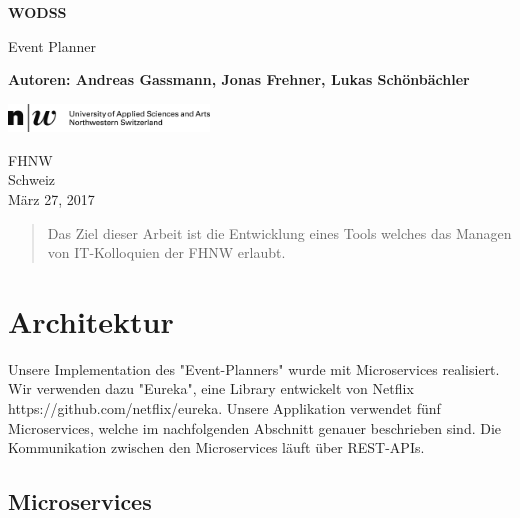 \documentclass[11pt]{article} %
\begin{document}
\begin{titlepage}
    \begin{center}
        \vspace*{1cm}
        
        \Huge
        \textbf{WODSS}
        
        \vspace{0.5cm}
        \LARGE
        Event Planner
      
        \vspace{1.5cm}
        
        \textbf{Autoren: Andreas Gassmann, Jonas Frehner, Lukas Schönbächler}\\

		\vspace{1.5cm}        
                
        \vfill
        
       
        \vspace{0.8cm}
        
        \includegraphics[width=0.4\textwidth]{title/fhnw}
        
        \Large
        FHNW\\
        Schweiz\\
        März 27, 2017
        
    \end{center}
\end{titlepage}

\begin{abstract}
Das Ziel dieser Arbeit ist die Entwicklung eines Tools welches das Managen von IT-Kolloquien der FHNW erlaubt.
\end{abstract}

\newpage
\tableofcontents
\newpage

\section{Architektur}
Unsere Implementation des "Event-Planners" wurde mit Microservices realisiert. Wir verwenden dazu "Eureka", eine Library entwickelt von Netflix https://github.com/netflix/eureka.  Unsere Applikation verwendet fünf Microservices, welche im nachfolgenden Abschnitt genauer beschrieben sind. Die Kommunikation zwischen den Microservices läuft über REST-APIs.

\subsection{Microservices}
\end{document}
